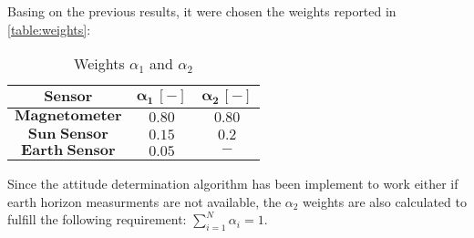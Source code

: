 Basing on the previous results, it were chosen the weights reported in \autoref{table:weights}:

\begin{table}[H]

    \centering
    \begin{tabular}{|c|c|c|}
    \hline
    $\bm{Sensor}$ & $\bm{\alpha_{1}\, [-]}$ & $\bm{\alpha_{2} \, [-]}$ \\
    \hline
    $\bm{Magnetometer}$ & $0.80$ & $0.80$  \\
    \hline
    $\bm{Sun\;Sensor}$ & $0.15$ & $0.2$  \\
    \hline
    $\bm{Earth\;Sensor}$ & $0.05$ & $\bm{-}$  \\
    \hline
    \end{tabular}
    
    \caption{Weights $\alpha_{1}$ and $\alpha_{2}$}
    \label{table:weights}
    
\end{table}

Since the attitude determination algorithm has been implement to work either if earth horizon measurments are not available, the $\alpha_2$ weights are also calculated to fulfill the following requirement: $\sum_{i=1}^N\alpha_i=1$.